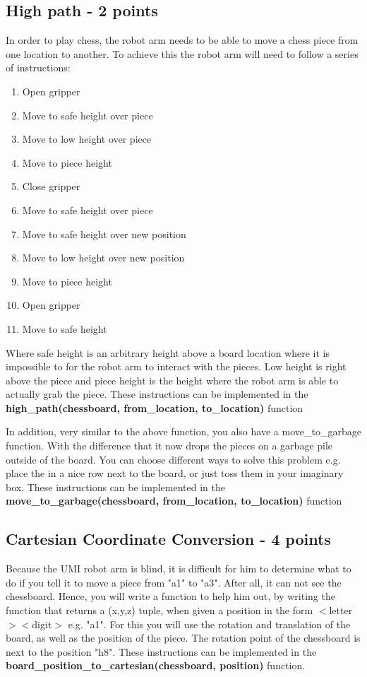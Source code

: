 \documentclass{article}
\begin{document}
\subsection*{High path - 2 points}
In order to play chess, the robot arm needs to be able to move a chess piece from one location to another. To achieve this the robot arm will need to follow a series of instructions:
\begin{enumerate}
\item Open gripper
\item Move to safe height over piece
\item Move to low height over piece
\item Move to piece height
\item Close gripper
\item Move to safe height over piece
\item Move to safe height over new position
\item Move to low height over new position
\item Move to piece height
\item Open gripper
\item Move to safe height
\end{enumerate}
Where safe height is an arbitrary height above a board location where it is impossible to for the robot arm to interact with the pieces. Low height is right above the piece and piece height is the height where the robot arm is able to actually grab the piece. These instructions can be implemented in the \textbf{high\_path(chessboard, from\_location, to\_location)} function

In addition, very similar to the above function, you also have a move\_to\_garbage function. With the difference that it now drops the pieces on a garbage pile outside of the board. You can choose different ways to solve this problem e.g. place the in a nice row next to the board, or just toss them in your imaginary box. These instructions can be implemented in the \textbf{move\_to\_garbage(chessboard, from\_location, to\_location)} function

\subsection*{Cartesian Coordinate Conversion - 4 points}
Because the UMI robot arm is blind, it is difficult for him to determine what to do if you tell it to move a piece from "a1" to "a3". After all, it can not see the chessboard. Hence, you will write a function to help him out, by writing the function that returns a (x,y,z) tuple, when given a position in the form $<$letter$><$digit$>$ e.g. "a1". For this you will use the rotation and translation of the board, as well as the position of the piece. The rotation point of the chessboard is next to the position "h8". These instructions can be implemented in the \textbf{board\_position\_to\_cartesian(chessboard, position)} function.
\end{document}
